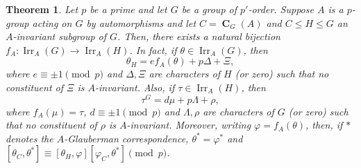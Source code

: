 \documentclass[10pt,a4paper]{amsart}
\newtheorem{thm}{Theorem}
\DeclareMathOperator{\CB}{\mathbf{C}}
\DeclareMathOperator{\Irr}{Irr}
\begin{document}
\begin{thm}
	\label{correspondence}
	Let $p$ be a prime and let $G$ be a group of $p'$-order. Suppose $A$ is a $p$-group acting on $G$ by automorphisms and let $C = \CB_G(A)$ and $C \leq H \leq G$ an $A$-invariant subgroup of $G$. Then, there exists a natural bijection $f_A: \Irr_{A}(G) \to \Irr_{A}(H)$. In fact, if $\theta \in \Irr_{A}(G)$, then
	\begin{equation*}
		\theta_H = ef_A(\theta) + p\Delta + \Xi,
	\end{equation*}
	where $e \equiv \pm 1 \pmod{p}$ and $\Delta, \Xi$ are characters of $H$ (or zero) such that no constituent of $\Xi$ is $A$-invariant. Also, if $\tau \in \Irr_{A}(H)$, then 
	\begin{equation*}
		\tau^G = d\mu + p\Lambda + \rho,
	\end{equation*}
	where $f_A(\mu) = \tau$, $d \equiv \pm 1 \pmod{p}$ and $\Lambda, \rho$ are characters of $G$ (or zero) such that no constituent of $\rho$ is $A$-invariant. Moreover, writing $\varphi = f_A(\theta)$, then, if $*$ denotes the $A$-Glauberman correspondence, $\theta^* = \varphi^*$ and $[\theta_C, \theta^*] \equiv [\theta_H, \varphi][\varphi_C, \theta^*] \pmod{p}$.
\end{thm}
\end{document}
